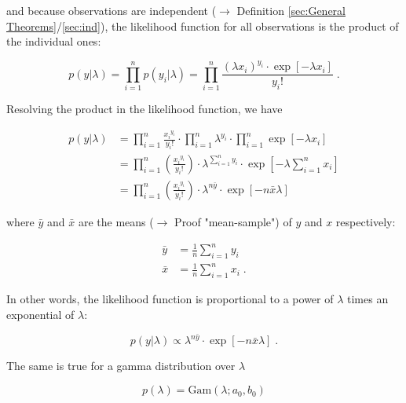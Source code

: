 \documentclass[a4paper,12pt,twoside]{book}
\begin{document}
and because observations are independent ($\rightarrow$ Definition \ref{sec:General Theorems}/\ref{sec:ind}), the likelihood function for all observations is the product of the individual ones:

\begin{equation} \label{eq:poissexp-prior-Poiss-exp-LF-s2}
p(y|\lambda) = \prod_{i=1}^n p(y_i|\lambda) = \prod_{i=1}^n \frac{(\lambda x_i)^{y_i} \cdot \exp\left[-\lambda x_i\right]}{y_i !} \; .
\end{equation}

Resolving the product in the likelihood function, we have

\begin{equation} \label{eq:poissexp-prior-Poiss-exp-LF-s3}
\begin{split}
p(y|\lambda) &= \prod_{i=1}^n \frac{ {x_i}^{y_i}}{y_i !} \cdot \prod_{i=1}^n \lambda^{y_i} \cdot \prod_{i=1}^n \exp\left[-\lambda x_i\right] \\
&= \prod_{i=1}^n \left(\frac{ {x_i}^{y_i}}{y_i !}\right) \cdot \lambda^{\sum_{i=1}^n y_i} \cdot \exp\left[-\lambda \sum_{i=1}^n x_i\right] \\
&= \prod_{i=1}^n \left(\frac{ {x_i}^{y_i}}{y_i !}\right) \cdot \lambda^{n \bar{y}} \cdot \exp\left[-n \bar{x} \lambda\right]
\end{split}
\end{equation}

where $\bar{y}$ and $\bar{x}$ are the means ($\rightarrow$ Proof "mean-sample") of $y$ and $x$ respectively:

\begin{equation} \label{eq:poissexp-prior-xy-mean}
\begin{split}
\bar{y} &= \frac{1}{n} \sum_{i=1}^n y_i \\
\bar{x} &= \frac{1}{n} \sum_{i=1}^n x_i \; .
\end{split}
\end{equation}

In other words, the likelihood function is proportional to a power of $\lambda$ times an exponential of $\lambda$:

\begin{equation} \label{eq:poissexp-prior-Poiss-exp-LF-prop}
p(y|\lambda) \propto \lambda^{n \bar{y}} \cdot \exp\left[-n \bar{x} \lambda\right] \; .
\end{equation}

The same is true for a gamma distribution over $\lambda$

\begin{equation} \label{eq:poissexp-prior-Poiss-exp-prior-s1}
p(\lambda) = \mathrm{Gam}(\lambda; a_0, b_0)
\end{equation}
\end{document}
